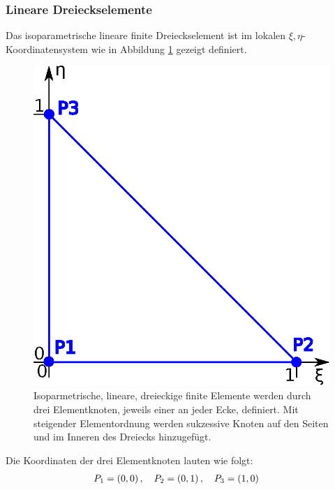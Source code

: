 \subsubsection{Lineare Dreieckselemente}
\label{sec:linear_triangles}
Das isoparametrische lineare finite Dreieckselement ist im lokalen $\xi,\eta$-Koordinatensystem wie in Abbildung \ref{fig:linear_element} gezeigt definiert. \newline

\begin{figure}[htbp]
	\begin{center}
		\includegraphics[scale=0.65]{pics/linear_element.eps}
	\end{center}
	\caption{Isoparmetrische, lineare, dreieckige finite Elemente werden durch drei Elementknoten, jeweils einer an jeder Ecke, definiert. Mit steigender Elementordnung werden sukzessive Knoten auf den Seiten und im Inneren des Dreiecks hinzugefügt. }
	\label{fig:linear_element}
\end{figure}

Die Koordinaten der drei Elementknoten lauten wie folgt:
\begin{align}
&P_1 = \left(0, 0 \right), \quad P_2 = \left(0, 1 \right), \quad P_3 = \left(1, 0 \right)
\end{align}

